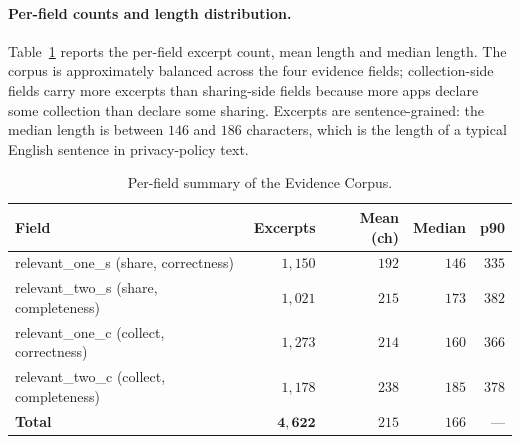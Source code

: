 \documentclass[11pt,a4paper]{article}
\newcommand{\dec}[1]{\textsf{#1}}
\begin{document}
\paragraph{Per-field counts and length distribution.}
Table~\ref{tab:corpus} reports the per-field excerpt count, mean
length and median length. The corpus is approximately balanced across
the four evidence fields; collection-side fields carry more excerpts
than sharing-side fields because more apps declare some collection
than declare some sharing. Excerpts are sentence-grained: the median
length is between $146$ and $186$ characters, which is the length of
a typical English sentence in privacy-policy text.

\begin{table}[t]
\centering\small
\caption{Per-field summary of the Evidence Corpus.}
\label{tab:corpus}
\begin{tabular}{lrrrr}
\toprule
Field & Excerpts & Mean (ch) & Median & p90 \\
\midrule
\dec{relevant\_one\_s} (share, correctness)    & $1{,}150$ & $192$ & $146$ & $335$ \\
\dec{relevant\_two\_s} (share, completeness)   & $1{,}021$ & $215$ & $173$ & $382$ \\
\dec{relevant\_one\_c} (collect, correctness)  & $1{,}273$ & $214$ & $160$ & $366$ \\
\dec{relevant\_two\_c} (collect, completeness) & $1{,}178$ & $238$ & $185$ & $378$ \\
\midrule
\textbf{Total}                                  & $\mathbf{4{,}622}$ & $215$ & $166$ & --- \\
\bottomrule
\end{tabular}
\end{table}
\end{document}

